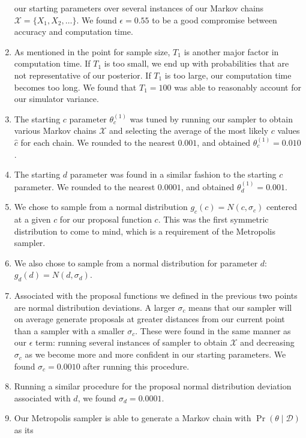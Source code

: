 \begin{enumerate}
        our starting parameters over several instances of our Markov chains $\mathcal{X} = \{ X_1, X_2, \ldots \}$.
        We found $\epsilon=0.55$ to be a good compromise between accuracy and computation time.
    \item As mentioned in the point for sample size, $T_1$ is another major factor in computation time.
        If $T_1$ is too small, we end up with probabilities that are not representative of our posterior.
        If $T_1$ is too large, our computation time becomes too long.
        We found that $T_1 = 100$ was able to reasonably account for our simulator variance.
    \item The starting $c$ parameter $\theta^{(1)}_c$ was tuned by running our sampler to obtain various Markov chains
        $\mathcal{X}$ and selecting the average of the most likely $c$ values $\hat{c}$ for each chain.
        We rounded to the nearest $0.001$, and obtained $\theta^{(1)}_c = 0.010$.
    \item The starting $d$ parameter was found in a similar fashion to the starting $c$ parameter.
        We rounded to the nearest $0.0001$, and obtained $\theta^{(1)}_d = 0.001$.
    \item We chose to sample from a normal distribution $g_c(c) = N(c, \sigma_c)$ centered at a given $c$ for our
        proposal function $c$.
        This was the first symmetric distribution to come to mind, which is a requirement of the Metropolis sampler.
    \item We also chose to sample from a normal distribution for parameter $d$: $g_d(d) = N(d, \sigma_d)$.
    \item Associated with the proposal functions we defined in the previous two points are normal distribution
        deviations.
        A larger $\sigma_c$ means that our sampler will on average generate proposals at greater distances from our
        current point than a sampler with a smaller $\sigma_c$.
        These were found in the same manner as our $\epsilon$ term: running several instances of sampler to obtain
        $\mathcal{X}$ and decreasing $\sigma_c$ as we become more and more confident in our starting parameters.
        We found $\sigma_c = 0.0010$ after running this procedure.
    \item Running a similar procedure for the proposal normal distribution deviation associated with $d$, we found
        $\sigma_d = 0.0001$.
    \item Our Metropolis sampler is able to generate a Markov chain with $\Pr(\theta \mid \mathcal{D})$ as its

\end{enumerate}
